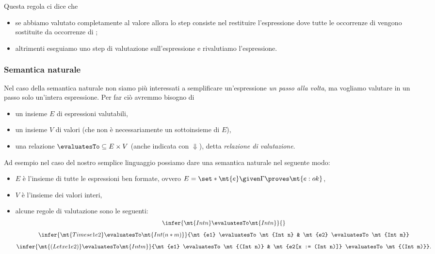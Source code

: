 Questa regola ci dice che \begin{itemize}
    \item se abbiamo valutato completamente  al valore  allora lo step consiste nel restituire l'espressione  dove tutte le occorrenze di  vengono sostituite da occorrenze di ;
    \item altrimenti eseguiamo uno step di valutazione sull'espressione  e rivalutiamo l'espressione.
\end{itemize}

\subsubsection{Semantica naturale}

Nel caso della semantica naturale non siamo più interessati a semplificare un'espressione \emph{un passo alla volta}, ma vogliamo valutare in un passo solo un'intera espressione. Per far ciò avremmo bisogno di
\begin{itemize}
    \item un insieme $E$ di espressioni valutabili,
    \item un insieme $V$ di valori (che non è necessariamente un sottoinsieme di $E$),
    \item una relazione $\evaluatesTo \subseteq E \times V$ (anche indicata con $\Downarrow$), detta \emph{relazione di valutazione}.
\end{itemize}

Ad esempio nel caso del nostro semplice linguaggio possiamo dare una semantica naturale nel seguente modo:
\begin{itemize}
    \item $E$ è l'insieme di tutte le espressioni ben formate, ovvero $E = \set*{\mt{e} \given \Gamma \proves \mt{e : ok}}$,
    \item $V$ è l'insieme dei valori interi,
    \item alcune regole di valutazione sono le seguenti: \begin{gather*}
        \infer{\mt{Int n} \evaluatesTo \mt{Int n}}{}\\[5pt]
        \infer{\mt{Times e1 e2} \evaluatesTo \mt{Int (n*m)}}{\mt{e1} \evaluatesTo \mt{Int n} & \mt{e2} \evaluatesTo \mt{Int m}}\\[5pt]
        \infer{\mt{(Let x e1 e2)} \evaluatesTo \mt{Int m}}{\mt{e1} \evaluatesTo \mt{(Int n)} & \mt{e2[x := (Int n)]} \evaluatesTo \mt{(Int m)}}.
    \end{gather*}
\end{itemize}

